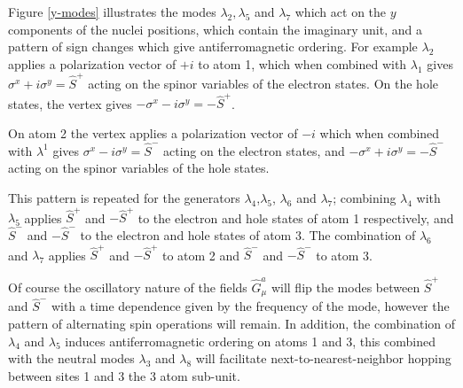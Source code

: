 \documentclass[prb,showpacs,superscriptaddress,titlepage,amsmath,amssymb,twocolumn]{revtex4-1}
\begin{document}
Figure \ref{y-modes} illustrates the modes $\lambda_{2}, \lambda_{5}$ and $\lambda_{7}$ which act on the $y$ components of the nuclei positions, which contain the imaginary unit, and a pattern of sign changes which give antiferromagnetic ordering. For example $\lambda_{2}$ applies a polarization vector of $+i$ to atom 1, which when combined with $\lambda_{1}$ gives $\sigma^{x}+i\sigma^{y} = \hat{S}^{+}$ acting on the spinor variables of the electron states. On the hole states, the vertex gives $-\sigma^{x}-i\sigma^{y} = -\hat{S}^{+}$.

On atom 2 the vertex applies a polarization vector of $-i$ which when combined with $\lambda ^{1}$ gives $\sigma^{x}-i\sigma^{y} = \hat{S}^{-}$ acting on the electron states, and $-\sigma^{x}+i\sigma^{y} = -\hat{S}^{-}$ acting on the spinor variables of the hole states. 

This pattern is repeated for the generators $\lambda_{4}$,$\lambda_{5}$, $\lambda_{6}$ and $\lambda_{7}$; combining $\lambda_{4}$ with $\lambda_{5}$ applies $\hat{S}^{+}$ and $-\hat{S}^{+}$ to the electron and hole states of atom 1 respectively, and $\hat{S}^{-}$ and $-\hat{S}^{-}$ to the electron and hole states of atom 3. The combination of $\lambda_{6}$ and $\lambda_{7}$ applies $\hat{S}^{+}$ and $-\hat{S}^{+}$ to atom 2 and $\hat{S}^{-}$ and $-\hat{S}^{-}$ to atom 3.

Of course the oscillatory nature of the fields $\hat{G}^{a}_{\mu}$ will flip the modes between $\hat{S}^{+}$ and $\hat{S}^{-}$ with a time dependence given by the frequency of the mode, however the pattern of alternating spin operations will remain. In addition, the combination of $\lambda_{4}$ and $\lambda_{5}$ induces antiferromagnetic ordering on atoms 1 and 3, this combined with the neutral modes $\lambda_{3}$ and $\lambda_{8}$ will facilitate next-to-nearest-neighbor hopping between sites 1 and 3 the 3 atom sub-unit.
\end{document}
